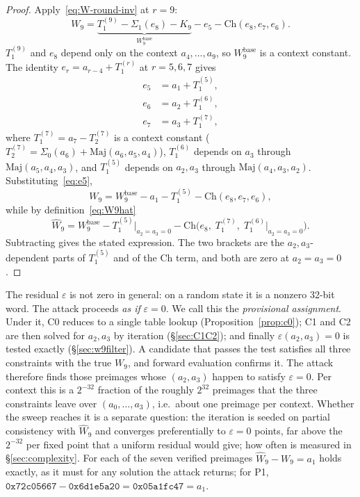 \documentclass[11pt,a4paper]{article}
\newcommand{\Sig}[1]{\Sigma_{#1}}
\newcommand{\Maj}{\mathrm{Maj}}
\newcommand{\Ch}{\mathrm{Ch}}
\begin{document}
\begin{proof}
Apply~\eqref{eq:W-round-inv} at $r=9$:
\[
  W_9 = \underbrace{T_1^{(9)} - \Sig{1}(e_8) - K_9}_{W_9^{\mathrm{base}}}
        - e_5 - \Ch(e_8,e_7,e_6).
\]
$T_1^{(9)}$ and $e_8$ depend only on the context $a_4,\ldots,a_9$, so
$W_9^{\mathrm{base}}$ is a context constant.  The identity
$e_r = a_{r-4} + T_1^{(r)}$ at $r = 5, 6, 7$ gives
\begin{align}
  e_5 &= a_1 + T_1^{(5)}, \label{eq:e5} \\
  e_6 &= a_2 + T_1^{(6)}, \label{eq:e6} \\
  e_7 &= a_3 + T_1^{(7)}, \label{eq:e7}
\end{align}
where $T_1^{(7)} = a_7 - T_2^{(7)}$ is a context constant
($T_2^{(7)} = \Sig{0}(a_6)+\Maj(a_6,a_5,a_4)$), $T_1^{(6)}$ depends on
$a_3$ through $\Maj(a_5,a_4,a_3)$, and $T_1^{(5)}$ depends on $a_2,a_3$
through $\Maj(a_4,a_3,a_2)$.  Substituting~\eqref{eq:e5},
\[
  W_9 = W_9^{\mathrm{base}} - a_1 - T_1^{(5)} - \Ch(e_8,e_7,e_6),
\]
while by definition~\eqref{eq:W9hat}
\[
  \hat{W}_9 = W_9^{\mathrm{base}} - T_1^{(5)}\!\bigr|_{a_2=a_3=0}
              - \Ch\!\bigl(e_8,\; T_1^{(7)},\; T_1^{(6)}\!\bigr|_{a_2=a_3=0}\bigr).
\]
Subtracting gives the stated expression.  The two brackets are the
$a_2,a_3$-dependent parts of $T_1^{(5)}$ and of the $\Ch$ term, and both
are zero at $a_2=a_3=0$.
\end{proof}

The residual $\varepsilon$ is not zero in general: on a random state it is
a nonzero 32-bit word.  The attack proceeds \emph{as if} $\varepsilon=0$.
We call this the \emph{provisional assignment}.  Under it, C0 reduces to a
single table lookup (Proposition~\ref{prop:c0}); C1 and C2 are then solved
for $a_2,a_3$ by iteration (\S\ref{sec:C1C2}); and finally
$\varepsilon(a_2,a_3)=0$ is tested exactly (\S\ref{sec:w9filter}).  A
candidate that passes the test satisfies all three constraints with the
true $W_9$, and forward evaluation confirms it.  The attack therefore finds
those preimages whose $(a_2,a_3)$ happen to satisfy $\varepsilon=0$.  Per context this is a $2^{-32}$ fraction of the roughly $2^{32}$ preimages that the three constraints leave over $(a_0,\ldots,a_3)$, i.e.\ about one preimage per context.  Whether the sweep reaches it is a separate question: the iteration is seeded on partial consistency with $\hat W_9$ and converges preferentially to $\varepsilon=0$ points, far above the $2^{-32}$ per fixed point that a uniform residual would give; how often is measured in \S\ref{sec:complexity}.  For
each of the seven verified preimages $\hat W_9 - W_9 = a_1$ holds exactly, as
it must for any solution the attack returns; for P1,
$\mathtt{0x72c05667} - \mathtt{0x6d1e5a20} = \mathtt{0x05a1fc47} = a_1$.
\end{document}

